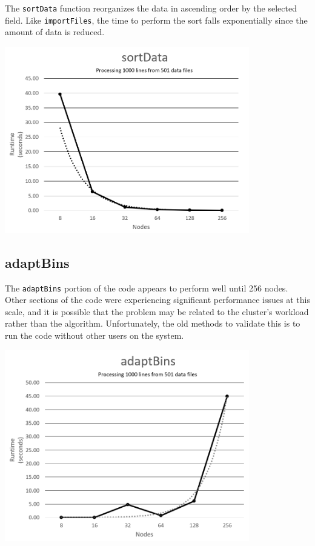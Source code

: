 The \texttt{sortData} function reorganizes the data in ascending order by the selected field. Like \texttt{importFiles}, the time to perform the sort falls exponentially since the amount of data is reduced.

\includegraphics[width=0.8\textwidth]{sortData.png}

\subsection{adaptBins}

The \texttt{adaptBins} portion of the code appears to perform well until 256 nodes. Other sections of the code were experiencing significant performance issues at this scale, and it is possible that the problem may be related to the cluster's workload rather than the algorithm. Unfortunately, the old methods to validate this is to run the code without other users on the system.

\includegraphics[width=0.8\textwidth]{adaptBins.png}


